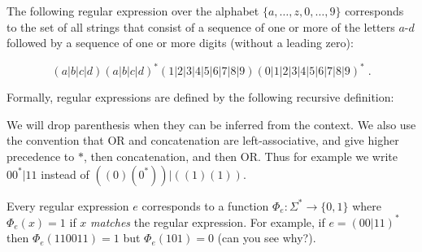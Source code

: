 The following regular expression over the alphabet
\(\{ a,\ldots,z,0,\ldots,9 \}\) corresponds to the set of all strings
that consist of a sequence of one or more of the letters \(a\)-\(d\)
followed by a sequence of one or more digits (without a leading zero):

\[
(a|b|c|d)(a|b|c|d)^*(1|2|3|4|5|6|7|8|9)(0|1|2|3|4|5|6|7|8|9)^* \;. \label{regexpeq}
\]

Formally, regular expressions are defined by the following recursive
definition:

\hypertarget{regexp}{}

We will drop parenthesis when they can be inferred from the context. We
also use the convention that OR and concatenation are left-associative,
and give higher precedence to \(*\), then concatenation, and then OR.
Thus for example we write \(00^*|11\) instead of
\(((0)(0^*))|((1)(1))\).

Every regular expression \(e\) corresponds to a function
\(\Phi_{e}:\Sigma^* \rightarrow \{0,1\}\) where \(\Phi_{e}(x)=1\) if
\(x\) \emph{matches} the regular expression. For example, if
\(e = (00|11)^*\) then \(\Phi_e(110011)=1\) but \(\Phi_e(101)=0\) (can
you see why?).

